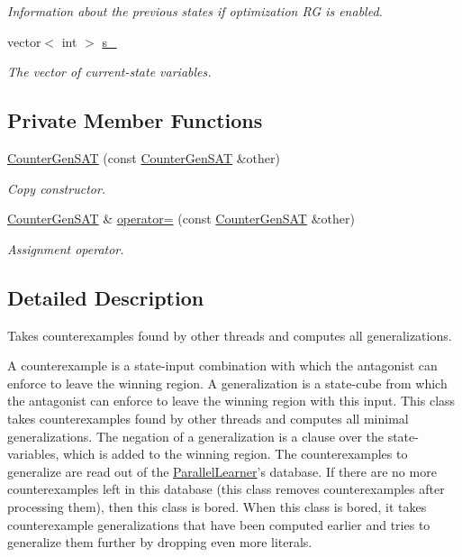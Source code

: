 \begin{DoxyCompactItemize}
\begin{DoxyCompactList}\small\item\em Information about the previous states if optimization R\-G is enabled. \end{DoxyCompactList}\item 
vector$<$ int $>$ \hyperlink{classCounterGenSAT_a5fe0494a5158f8614cdf358f1776dc25}{s\-\_\-}
\begin{DoxyCompactList}\small\item\em The vector of current-\/state variables. \end{DoxyCompactList}\end{DoxyCompactItemize}
\subsection*{Private Member Functions}
\begin{DoxyCompactItemize}
\item 
\hyperlink{classCounterGenSAT_a7a2d9c241f14798e2073b2ff298acd6f}{Counter\-Gen\-S\-A\-T} (const \hyperlink{classCounterGenSAT}{Counter\-Gen\-S\-A\-T} \&other)
\begin{DoxyCompactList}\small\item\em Copy constructor. \end{DoxyCompactList}\item 
\hyperlink{classCounterGenSAT}{Counter\-Gen\-S\-A\-T} \& \hyperlink{classCounterGenSAT_aa7bcdd4ed8d19447d39d83231123db5d}{operator=} (const \hyperlink{classCounterGenSAT}{Counter\-Gen\-S\-A\-T} \&other)
\begin{DoxyCompactList}\small\item\em Assignment operator. \end{DoxyCompactList}\end{DoxyCompactItemize}


\subsection{Detailed Description}
Takes counterexamples found by other threads and computes all generalizations. 

A counterexample is a state-\/input combination with which the antagonist can enforce to leave the winning region. A generalization is a state-\/cube from which the antagonist can enforce to leave the winning region with this input. This class takes counterexamples found by other threads and computes all minimal generalizations. The negation of a generalization is a clause over the state-\/variables, which is added to the winning region. The counterexamples to generalize are read out of the \hyperlink{classParallelLearner}{Parallel\-Learner}'s database. If there are no more counterexamples left in this database (this class removes counterexamples after processing them), then this class is bored. When this class is bored, it takes counterexample generalizations that have been computed earlier and tries to generalize them further by dropping even more literals.

